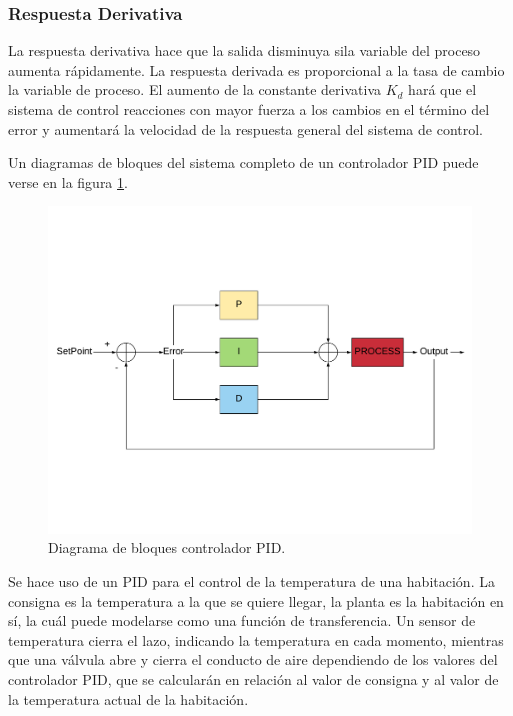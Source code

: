 \subsubsection{Respuesta Derivativa}
La respuesta derivativa hace que la salida disminuya sila variable del proceso aumenta rápidamente. La respuesta derivada es proporcional a la tasa de cambio la variable de proceso. El aumento de la constante derivativa $K_{d}$ hará que el sistema de control reacciones con mayor fuerza a los cambios en el término del error y aumentará la velocidad de la respuesta general del sistema de control. 

Un diagramas de bloques del sistema completo de un controlador PID puede verse en la figura \ref{fig:PID}.

\begin{center}
	\begin{figure}[H]
		\center
		\includegraphics[trim = 0mm 4cm 0mm 4cm,clip, angle=0, scale = 0.4]{imagenes/EstadoArte/PID}
		\caption{Diagrama de bloques controlador PID.}
		\label{fig:PID}
	\end{figure}
\end{center}

\begin{ejemplo}
Se hace uso de un PID para el control de la temperatura de una habitación. La consigna es la temperatura a la que se quiere llegar, la planta es la habitación en sí, la cuál puede modelarse como una función de transferencia. Un sensor de temperatura cierra el lazo, indicando la temperatura en cada momento, mientras que una válvula abre y cierra el conducto de aire dependiendo de los valores del controlador PID, que se calcularán en relación al valor de consigna y al valor de la temperatura actual de la habitación.
\end{ejemplo} 










